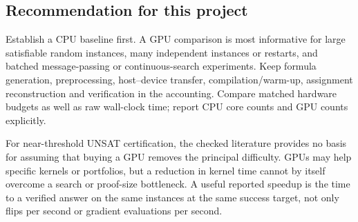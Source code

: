 \subsection{Recommendation for this project}
Establish a CPU baseline first. A GPU comparison is most informative for
large satisfiable random instances, many independent instances or restarts,
and batched message-passing or continuous-search experiments. Keep formula
generation, preprocessing, host--device transfer, compilation/warm-up,
assignment reconstruction and verification in the accounting. Compare
matched hardware budgets as well as raw wall-clock time; report CPU core
counts and GPU counts explicitly.

For near-threshold UNSAT certification, the checked literature provides no
basis for assuming that buying a GPU removes the principal difficulty.
GPUs may help specific kernels or portfolios, but a reduction in kernel
time cannot by itself overcome a search or proof-size bottleneck. A useful
reported speedup is the time to a verified answer on the same instances at
the same success target, not only flips per second or gradient evaluations
per second.
